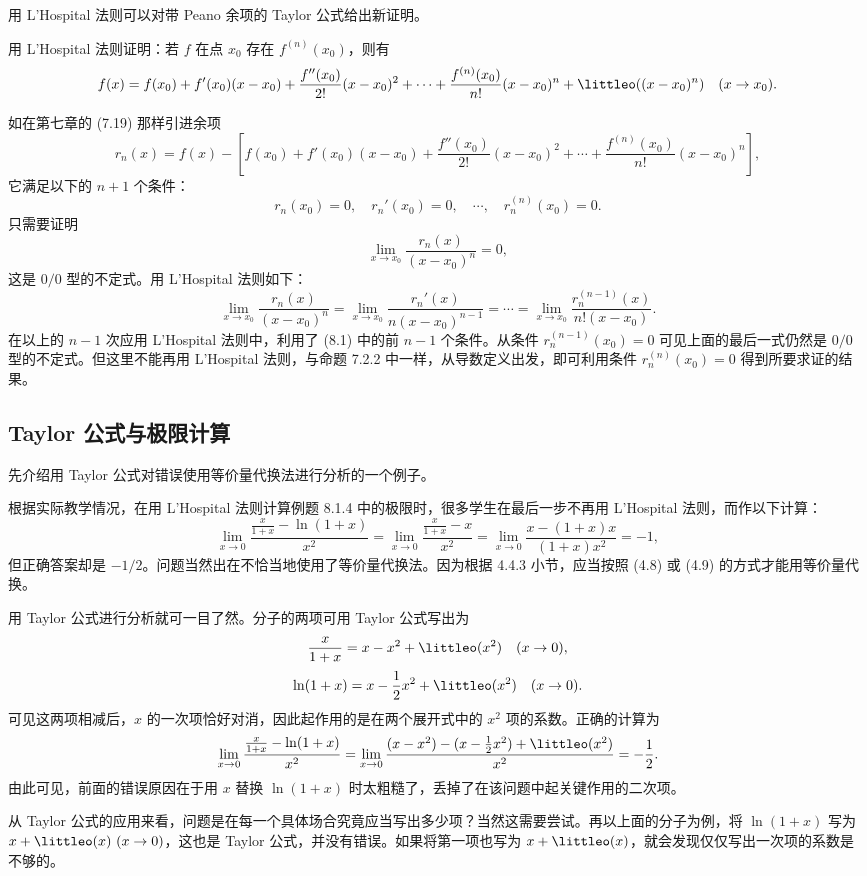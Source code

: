 用 L'Hospital 法则可以对带 Peano 余项的 Taylor 公式给出新证明。

\begin{xexample}[8.1.5]
用 L'Hospital 法则证明：若 $f$ 在点 $x_0$ 存在 $f^{(n)}(x_0)$，则有
\[
  f(x)=f(x_0)+f'(x_0)(x-x_0)+\frac{f''(x_0)}{2!}(x-x_0)^2+\cdots
  +\frac{f^{(n)}(x_0)}{n!}(x-x_0)^n+\littleo((x-x_0)^n)
  \quad(x\to x_0).
\]
\end{xexample}
\begin{xproof}
如在第七章的 (7.19) 那样引进余项
\[
  r_n(x)=f(x)-\left[f(x_0)+f'(x_0)(x-x_0)+\frac{f''(x_0)}{2!}(x-x_0)^2+\cdots
  +\frac{f^{(n)}(x_0)}{n!}(x-x_0)^n\right],
\]
它满足以下的 $n+1$ 个条件：
\begin{equation}
  r_n(x_0)=0,\quad r_n'(x_0)=0,\quad\cdots,\quad r_n^{(n)}(x_0)=0.
  \tag{8.1}
  \label{eq:8.1}
\end{equation}
只需要证明
\[
  \lim_{x\to x_0}\frac{r_n(x)}{(x-x_0)^n}=0,
\]
这是 $0/0$ 型的不定式。用 L'Hospital 法则如下：
\[
  \lim_{x\to x_0}\frac{r_n(x)}{(x-x_0)^n}
  =\lim_{x\to x_0}\frac{r_n'(x)}{n(x-x_0)^{n-1}}
  =\cdots
  =\lim_{x\to x_0}\frac{r_n^{(n-1)}(x)}{n!(x-x_0)}.
\]
在以上的 $n-1$ 次应用 L'Hospital 法则中，利用了 (8.1) 中的前 $n-1$ 个条件。从条件 $r_n^{(n-1)}(x_0)=0$ 可见上面的最后一式仍然是 $0/0$ 型的不定式。但这里不能再用 L'Hospital 法则，与命题 7.2.2 中一样，从导数定义出发，即可利用条件 $r_n^{(n)}(x_0)=0$ 得到所要求证的结果。
\end{xproof}

\subsection{Taylor 公式与极限计算}

先介绍用 Taylor 公式对错误使用等价量代换法进行分析的一个例子。

\begin{xexample}[8.1.6]
根据实际教学情况，在用 L'Hospital 法则计算例题 8.1.4 中的极限时，很多学生在最后一步不再用 L'Hospital 法则，而作以下计算：
\[
  \lim_{x\to0}\frac{\frac{x}{1+x}-\ln(1+x)}{x^2}
  =\lim_{x\to0}\frac{\frac{x}{1+x}-x}{x^2}
  =\lim_{x\to0}\frac{x-(1+x)x}{(1+x)x^2}=-1,
\]
但正确答案却是 $-1/2$。问题当然出在不恰当地使用了等价量代换法。因为根据 4.4.3 小节，应当按照 (4.8) 或 (4.9) 的方式才能用等价量代换。

用 Taylor 公式进行分析就可一目了然。分子的两项可用 Taylor 公式写出为
\[
  \frac{x}{1+x}=x-x^2+\littleo(x^2)\quad(x\to0),
\]
\[
  \ln(1+x)=x-\frac12x^2+\littleo(x^2)\quad(x\to0).
\]
可见这两项相减后，$x$ 的一次项恰好对消，因此起作用的是在两个展开式中的 $x^2$ 项的系数。正确的计算为
\[
  \lim_{x\to0}\frac{\frac{x}{1+x}-\ln(1+x)}{x^2}
  =\lim_{x\to0}\frac{(x-x^2)-(x-\frac12x^2)+\littleo(x^2)}{x^2}
  =-\frac12.
\]
由此可见，前面的错误原因在于用 $x$ 替换 $\ln(1+x)$ 时太粗糙了，丢掉了在该问题中起关键作用的二次项。

从 Taylor 公式的应用来看，问题是在每一个具体场合究竟应当写出多少项？当然这需要尝试。再以上面的分子为例，将 $\ln(1+x)$ 写为 $x+\littleo(x)\ (x\to0)$，这也是 Taylor 公式，并没有错误。如果将第一项也写为 $x+\littleo(x)$，就会发现仅仅写出一次项的系数是不够的。
\end{xexample}

